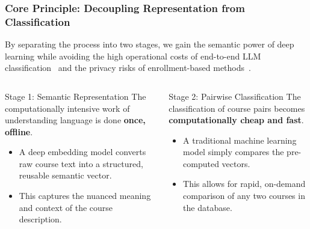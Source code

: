 \documentclass[aspectratio=169,10pt]{beamer}
\begin{document}
\begin{frame}
    \frametitle{Core Principle: Decoupling Representation from Classification}

    By separating the process into two stages, we gain the semantic power of deep learning while avoiding the high operational costs of end-to-end LLM classification~\cite{Errica2024WhatDI} and the privacy risks of enrollment-based methods~\cite{slade10.1177/0002764213479366}.
    
    \fontsize{9}{9}\selectfont
    \begin{columns}[T]
        \begin{column}{0.45\textwidth}
            \begin{block}{Stage 1: Semantic Representation}
                The computationally intensive work of understanding language is done \textbf{once, offline}.
                
                \begin{itemize}
                    \item A deep embedding model converts raw course text into a structured, reusable semantic vector.
                    \item This captures the nuanced meaning and context of the course description.
                \end{itemize}
            \end{block}
        \end{column}
        
        \begin{column}{0.45\textwidth}
            \begin{block}{Stage 2: Pairwise Classification}
                The classification of course pairs becomes \textbf{computationally cheap and fast}.
                
                \begin{itemize}
                    \item A traditional machine learning model simply compares the pre-computed vectors.
                    \item This allows for rapid, on-demand comparison of any two courses in the database.
                \end{itemize}
            \end{block}
        \end{column}
    \end{columns}
    

\end{frame}
\end{document}
